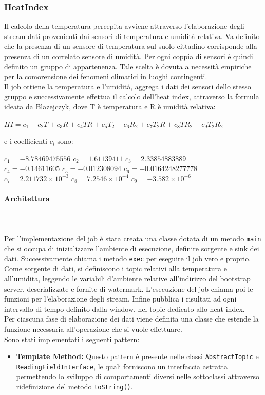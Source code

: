 \documentclass[8pt]{article}
\newcommand{\subsubsubsection}[1]{\paragraph{#1}\mbox{}\\\\}
\begin{document}
\subsubsection{HeatIndex}
Il calcolo della temperatura percepita avviene attraverso l'elaborazione degli stream dati provenienti dai sensori di temperatura e umidità relativa. Va definito che la presenza di un sensore di temperatura sul suolo cittadino corrisponde alla presenza di un correlato sensore di umidità. Per ogni coppia di sensori è quindi definito un gruppo di appartenenza. Tale scelta è dovuta a necessità empiriche per la comorensione dei fenomeni climatici in luoghi contingenti.
\\Il job ottiene la temperatura e l’umidità, aggrega i dati dei sensori dello stesso gruppo e successivamente effettua il calcolo dell'heat index, attraverso la
formula ideata da Blazejczyk, dove T è temperatura e R è umidità relativa:
\begin{center}
    $HI = c_1 + c_2T + c_3R + c_4T R + c_5T_2 + c_6R_2 + c_7T_2R + c_8TR_2 + c_9T_2R_2$
\end{center}
e i coefficienti $c_i$ sono:
\begin{center}
    $c_1 = -8.78469475556$ $c_2 = 1.61139411$ $c_3 = 2.33854883889$
    \\$c_4 = -0.14611605$ $c_5 = -0.012308094$ $c_6 = -0.0164248277778$
    \\$c_7 = 2.211732 × 10^{-3}$ $c_8 = 7.2546 × 10^{-4}$ $c_9 = -3.582 × 10^{-6}$
\end{center}
\clearpage
\subsubsubsection{Architettura}
Per l'implementazione del job è stata creata una classe dotata di un metodo \verb|main| che si occupa di inizializzare l’ambiente di esecuzione, definire sorgente e sink dei dati. Successivamente chiama i metodo \verb|exec| per eseguire il job vero e proprio. Come sorgente di dati, si definiscono i topic relativi
alla temperatura e all’umidita, leggendo le variabili d’ambiente relative all’indirizzo del bootstrap server, deserializzate e fornite di watermark. L'esecuzione del job chiama poi le funzioni per l'elaborazione degli stream. Infine pubblica i risultati ad ogni intervallo di tempo definito dalla window, nel topic dedicato allo heat index.
\\Per ciascuna fase di elaborazione dei dati viene definita una classe che estende la funzione necessaria all'operazione che si vuole effettuare.
\\Sono stati implementati i seguenti pattern:
\begin{itemize}
    \item \textbf{Template Method:}
    Questo pattern è presente nelle classi \verb|AbstractTopic| e \verb|ReadingFieldInterface|, le quali forniscono un interfaccia astratta permettendo lo sviluppo di comportamenti diversi nelle sottoclassi attraverso ridefinizione del metodo \verb|toString()|.
\end{itemize}
\end{document}
